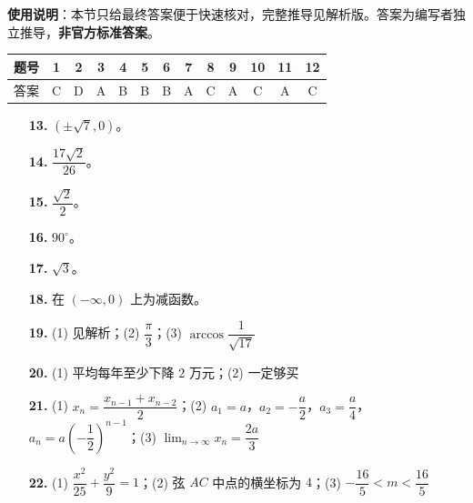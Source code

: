 
\begin{gknotice}
\textbf{使用说明}：本节只给最终答案便于快速核对，完整推导见解析版。答案为编写者独立推导，\textbf{非官方标准答案}。
\end{gknotice}

\begin{center}\begin{tabular}{ccccccccccccc}
\toprule
题号 & 1 & 2 & 3 & 4 & 5 & 6 & 7 & 8 & 9 & 10 & 11 & 12 \\
\midrule
答案 & C & D & A & B & B & B & A & C & A & C & A & C \\
\bottomrule
\end{tabular}\end{center}

\begin{itemize}[leftmargin=2.6em]
  \item[\textbf{13.}] $(\pm\sqrt7,0)$。
  \item[\textbf{14.}] $\dfrac{17\sqrt2}{26}$。
  \item[\textbf{15.}] $\dfrac{\sqrt2}{2}$。
  \item[\textbf{16.}] $90^\circ$。
\end{itemize}

\begin{itemize}[leftmargin=2.6em]
  \item[\textbf{17.}] $\sqrt3$。
  \item[\textbf{18.}] 在 $(-\infty,0)$ 上为减函数。
  \item[\textbf{19.}] (1) 见解析；(2) $\dfrac\pi3$；(3) $\arccos\dfrac1{\sqrt{17}}$
  \item[\textbf{20.}] (1) 平均每年至少下降 $2$ 万元；(2) 一定够买
  \item[\textbf{21.}] (1) $x_n=\dfrac{x_{n-1}+x_{n-2}}2$；(2) $a_1=a$，$a_2=-\dfrac a2$，$a_3=\dfrac a4$，$a_n=a\left(-\dfrac12\right)^{n-1}$；(3) $\displaystyle\lim_{n\to\infty}x_n=\dfrac{2a}{3}$
  \item[\textbf{22.}] (1) $\dfrac{x^2}{25}+\dfrac{y^2}{9}=1$；(2) 弦 $AC$ 中点的横坐标为 $4$；(3) $-\dfrac{16}{5}<m<\dfrac{16}{5}$
\end{itemize}
